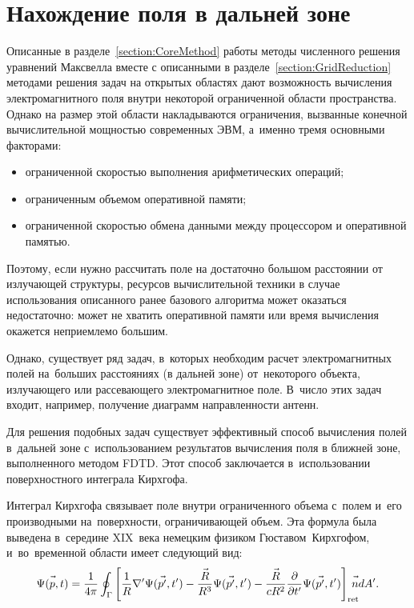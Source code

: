 

\section{Нахождение поля в дальней зоне}

Описанные в разделе~\ref{section:CoreMethod} работы методы численного решения
уравнений Максвелла вместе с описанными в разделе~\ref{section:GridReduction}
методами решения задач на открытых областях дают возможность вычисления
электромагнитного поля внутри некоторой ограниченной области пространства.
Однако на размер этой области накладываются ограничения, вызванные конечной
вычислительной мощностью современных ЭВМ, а~именно тремя основными факторами:
\begin{itemize}
\item ограниченной скоростью выполнения арифметических операций;
\item ограниченным объемом оперативной памяти;
\item ограниченной скоростью обмена данными между процессором
      и оперативной памятью.
\end{itemize}
Поэтому, если нужно рассчитать поле на достаточно большом расстоянии от излучающей
структуры, ресурсов вычислительной техники в случае использования описанного
ранее базового алгоритма может оказаться недостаточно: может не хватить
оперативной памяти или время вычисления окажется неприемлемо большим.

Однако, существует ряд задач, в~которых необходим расчет электромагнитных полей
на~больших расстояниях (в дальней зоне) от~некоторого объекта, излучающего или
рассевающего электромагнитное поле. В~число этих задач входит, например,
получение диаграмм направленности антенн.

Для решения подобных задач существует эффективный способ вычисления полей
в~дальней зоне с~использованием результатов вычисления поля в ближней зоне,
выполненного методом FDTD. Этот способ заключается в~использовании
поверхностного интеграла Кирхгофа.

Интеграл Кирхгофа связывает поле внутри ограниченного объема с~полем и~его
производными на~поверхности, ограничивающей объем. Эта формула была выведена
в~середине XIX~века немецким физиком Гюставом~Кирхгофом, и~во~временной области
имеет следующий вид:
\begin{equation}
    \label{eq:KirchhoffIntegral}
    \Psi(\vec{p\mathstrut},t) = \frac{1}{4\pi} \oint_\Gamma
    \left[
        \frac{1}{R}\nabla'\Psi(\vec{p'\mathstrut},t') -
        \frac{\vec{R\mathstrut}}{R^3}\Psi(\vec{p'\mathstrut},t') -
        \frac{\vec{R\mathstrut}}{cR^2}\frac{\partial}{\partial t'}\Psi(\vec{p'\mathstrut},t')
    \right]_\text{ret} \!\!\!\!\!\vec{n\mathstrut} dA'.
\end{equation}

